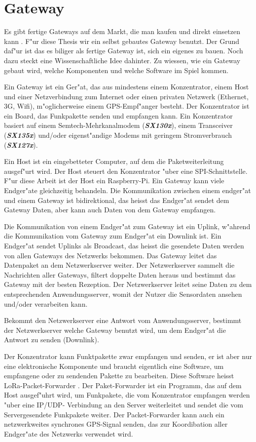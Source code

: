 \section{Gateway}\label{Gateway}

Es gibt fertige Gateways auf dem Markt, die man kaufen und direkt
einsetzen kann . F"ur diese Thesis wir ein selbst gebautes Gateway
benutzt. Der Grund daf"ur ist das es biliger als fertige Gateway ist,
sich ein eigenes zu bauen. Noch dazu steckt eine Wissenschaftliche Idee
dahinter. Zu wiessen, wie ein Gateway gebaut wird, welche Komponenten
und welche Software im Spiel kommen.  

Ein Gateway ist ein Ger"at, das aus mindestens einem Konzentrator, einem
Host und einer Netzverbindung zum Internet oder einen privaten Netzwerk
(Ethernet, 3G, Wifi), m"oglicherweise einem GPS-Empf"anger besteht. Der
Konzentrator ist ein Board, das Funkpakette senden und empfangen kann.
Ein Konzentrator basiert auf einem Semtech-Mehrkanalmodem
(\textbf{\textit{SX130x}}), einem Transceiver (\textbf{\textit{SX135x}})
und/oder eigenst"andige Modems mit geringem Stromverbrauch
(\textbf{\textit{SX127x}}).  

Ein Host ist ein eingebetteter Computer, auf dem die Paketweiterleitung
ausgef"urt wird. Der Host steuert den Konzentrator "uber eine
SPI-Schnittstelle. F"ur diese Arbeit ist der Host ein Raspberry-Pi. Ein
Gateway kann viele Endger"ate gleichzeitig behandeln. Die Kommunikation
zwischen einem endger"at und einem Gateway ist bidirektional, das heisst
das Endger"at sendet dem Gateway Daten, aber kann auch Daten von dem
Gateway empfangen.

Die Kommunikation von einem Endger"at zum Gateway ist ein Uplink,
w"ahrend die Kommunikation vom Gateway zum Endger"at ein Downlink ist.
Ein Endger"at sendet Uplinks als Broadcast, das heisst die gesendete
Daten werden von allen Gateways des Netzwerks bekommen. Das Gateway
leitet das Datenpaket an dem Netzwerkserver weiter. Der Netzwerkserver
sammelt die Nachrichten aller Gateways, filtert doppelte Daten heraus
und bestimmt das Gateway mit der besten Rezeption. Der Netzwerkserver
leitet seine Daten zu dem entsprechenden Anwendungsserver, womit der
Nutzer die Sensordaten ansehen und/oder verarbeiten kann.

Bekommt den Netzwerkserver eine Antwort vom Anwendungsserver, bestimmt
der Netzwerkserver welche Gateway benutzt wird, um dem Endger"at die
Antwort zu senden (Downlink).

Der Konzentrator kann Funktpakette zwar empfangen und senden, er ist
aber nur eine elektronische Komponente und braucht eigentlich eine
Software, um empfangene oder zu sendenden Pakette zu bearbeiten. Diese 
Software heisst LoRa-Packet-Forwarder \cite{paketForwarder}. 
Der Paket-Forwarder ist ein Programm, das auf dem Host ausgef"uhrt wird,
um Funkpakete, die vom Konzentrator empfangen werden "uber eine IP/UDP-
Verbindung an den Server weiterleitet und sendet die vom Servergesendete 
Funkpakete weiter. Der Packet-Forwarder kann auch ein netzwerkweites
synchrones GPS-Signal senden, das zur Koordibation aller Endger"ate des
Netzwerks verwendet wird. 



